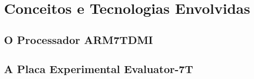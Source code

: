 %
%

\chapter{Conceitos e Tecnologias Envolvidas} \label{chap:conceitos}

\section{O Processador ARM7TDMI} \label{sec:conceitos_processador}


\section{A Placa Experimental Evaluator-7T} \label{sec:conceitos_placa}
